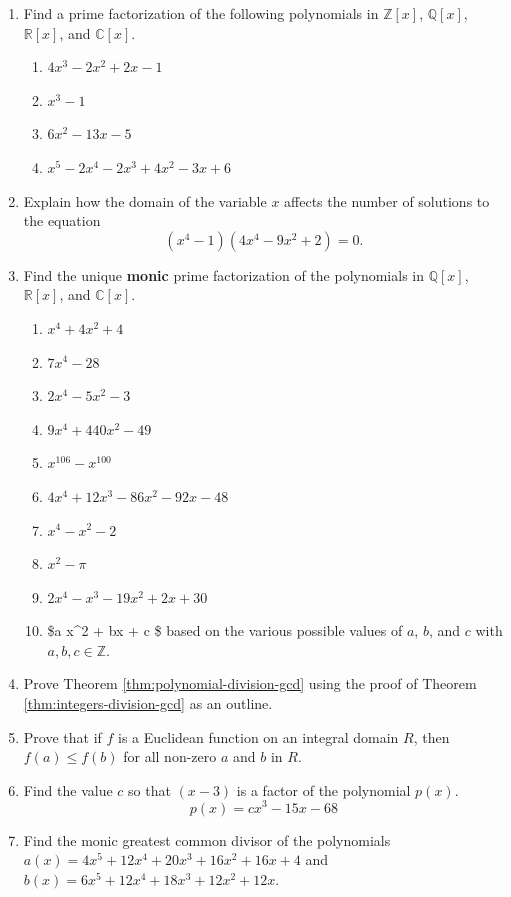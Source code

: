\documentclass[
]{book}
\providecommand{\tightlist}{%
  \setlength{\itemsep}{0pt}\setlength{\parskip}{0pt}}
\theoremstyle{definition}
\theoremstyle{definition}
\theoremstyle{definition}
\theoremstyle{remark}
\begin{document}
\begin{enumerate}
\def\labelenumi{\arabic{enumi}.}
\item
  Find a prime factorization of the following polynomials in \(\mathbb{Z}[x]\), \(\mathbb{Q}[x]\), \(\mathbb{R}[x]\), and \(\mathbb{C}[x]\).

  \begin{enumerate}
  \def\labelenumii{\alph{enumii}.}
  \tightlist
  \item
    \(4x^3-2x^2+2x-1\)
  \item
    \(x^3-1\)
  \item
    \(6x^2-13x-5\)
  \item
    \(x^5-2x^4-2x^3+4x^2-3x+6\)
  \end{enumerate}
\item
  Explain how the domain of the variable \(x\) affects the number of solutions to the equation \[(x^4-1)(4x^4-9x^2+2)=0.\]
\item
  Find the unique \textbf{monic} prime factorization of the polynomials in \(\mathbb{Q}[x]\), \(\mathbb{R}[x]\), and \(\mathbb{C}[x]\).

  \begin{enumerate}
  \def\labelenumii{\alph{enumii}.}
  \tightlist
  \item
    \(x^4+4x^2+4\)
  \item
    \(7x^4-28\)
  \item
    \(2x^4-5x^2-3\)
  \item
    \(9x^4+440 x^2-49\)
  \item
    \(x^{106} -x^{100}\)
  \item
    \(4x^4+12x^3-86x^2-92x-48\)
  \item
    \(x^4-x^2-2\)
  \item
    \(x^2-\pi\)
  \item
    \(2x^4-x^3-19x^2+2x+30\)
  \item
    \$a x\^{}2 + bx + c \$ based on the various possible values of \(a\), \(b\), and \(c\) with \(a,b,c \in \mathbb{Z}\).
  \end{enumerate}
\item
  Prove Theorem \ref{thm:polynomial-division-gcd} using the proof of Theorem \ref{thm:integers-division-gcd} as an outline.
\item
  Prove that if \(f\) is a Euclidean function on an integral domain \(R\), then \(f(a)\leq f(b)\) for all non-zero \(a\) and \(b\) in \(R\).
\item
  Find the value \(c\) so that \((x-3)\) is a factor of the polynomial \(p(x)\). \[p(x)=cx^3-15x-68\]
\item
  Find the monic greatest common divisor of the polynomials \(a(x)=4x^5+12x^4+20x^3+16x^2+16x+4\) and \(b(x)=6x^5+12x^4+18x^3+12x^2+12x\).
\end{enumerate}
\end{document}
